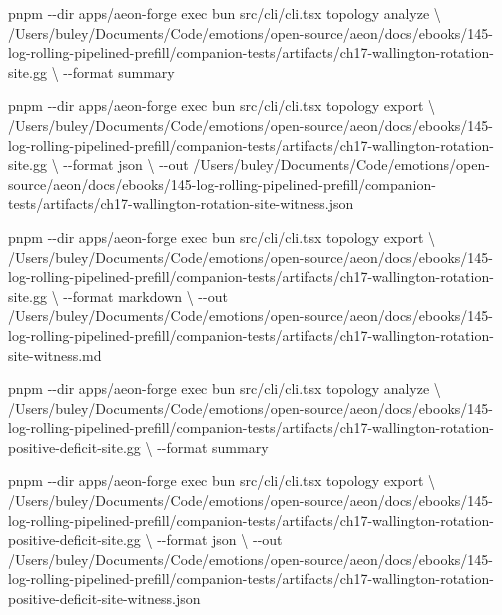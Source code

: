 \documentclass[
  11pt,
]{article}
\newenvironment{Shaded}{}{}
\newcommand{\AttributeTok}[1]{\textcolor[rgb]{0.49,0.56,0.16}{#1}}
\newcommand{\DataTypeTok}[1]{\textcolor[rgb]{0.56,0.13,0.00}{#1}}
\newcommand{\ExtensionTok}[1]{#1}
\newcommand{\NormalTok}[1]{#1}
\begin{document}
\begin{Shaded}
\begin{Highlighting}[]
\ExtensionTok{pnpm} \AttributeTok{{-}{-}dir}\NormalTok{ apps/aeon{-}forge exec bun src/cli/cli.tsx topology analyze }\DataTypeTok{\textbackslash{}}
\NormalTok{  /Users/buley/Documents/Code/emotions/open{-}source/aeon/docs/ebooks/145{-}log{-}rolling{-}pipelined{-}prefill/companion{-}tests/artifacts/ch17{-}wallington{-}rotation{-}site.gg }\DataTypeTok{\textbackslash{}}
  \AttributeTok{{-}{-}format}\NormalTok{ summary}

\ExtensionTok{pnpm} \AttributeTok{{-}{-}dir}\NormalTok{ apps/aeon{-}forge exec bun src/cli/cli.tsx topology export }\DataTypeTok{\textbackslash{}}
\NormalTok{  /Users/buley/Documents/Code/emotions/open{-}source/aeon/docs/ebooks/145{-}log{-}rolling{-}pipelined{-}prefill/companion{-}tests/artifacts/ch17{-}wallington{-}rotation{-}site.gg }\DataTypeTok{\textbackslash{}}
  \AttributeTok{{-}{-}format}\NormalTok{ json }\DataTypeTok{\textbackslash{}}
  \AttributeTok{{-}{-}out}\NormalTok{ /Users/buley/Documents/Code/emotions/open{-}source/aeon/docs/ebooks/145{-}log{-}rolling{-}pipelined{-}prefill/companion{-}tests/artifacts/ch17{-}wallington{-}rotation{-}site{-}witness.json}

\ExtensionTok{pnpm} \AttributeTok{{-}{-}dir}\NormalTok{ apps/aeon{-}forge exec bun src/cli/cli.tsx topology export }\DataTypeTok{\textbackslash{}}
\NormalTok{  /Users/buley/Documents/Code/emotions/open{-}source/aeon/docs/ebooks/145{-}log{-}rolling{-}pipelined{-}prefill/companion{-}tests/artifacts/ch17{-}wallington{-}rotation{-}site.gg }\DataTypeTok{\textbackslash{}}
  \AttributeTok{{-}{-}format}\NormalTok{ markdown }\DataTypeTok{\textbackslash{}}
  \AttributeTok{{-}{-}out}\NormalTok{ /Users/buley/Documents/Code/emotions/open{-}source/aeon/docs/ebooks/145{-}log{-}rolling{-}pipelined{-}prefill/companion{-}tests/artifacts/ch17{-}wallington{-}rotation{-}site{-}witness.md}

\ExtensionTok{pnpm} \AttributeTok{{-}{-}dir}\NormalTok{ apps/aeon{-}forge exec bun src/cli/cli.tsx topology analyze }\DataTypeTok{\textbackslash{}}
\NormalTok{  /Users/buley/Documents/Code/emotions/open{-}source/aeon/docs/ebooks/145{-}log{-}rolling{-}pipelined{-}prefill/companion{-}tests/artifacts/ch17{-}wallington{-}rotation{-}positive{-}deficit{-}site.gg }\DataTypeTok{\textbackslash{}}
  \AttributeTok{{-}{-}format}\NormalTok{ summary}

\ExtensionTok{pnpm} \AttributeTok{{-}{-}dir}\NormalTok{ apps/aeon{-}forge exec bun src/cli/cli.tsx topology export }\DataTypeTok{\textbackslash{}}
\NormalTok{  /Users/buley/Documents/Code/emotions/open{-}source/aeon/docs/ebooks/145{-}log{-}rolling{-}pipelined{-}prefill/companion{-}tests/artifacts/ch17{-}wallington{-}rotation{-}positive{-}deficit{-}site.gg }\DataTypeTok{\textbackslash{}}
  \AttributeTok{{-}{-}format}\NormalTok{ json }\DataTypeTok{\textbackslash{}}
  \AttributeTok{{-}{-}out}\NormalTok{ /Users/buley/Documents/Code/emotions/open{-}source/aeon/docs/ebooks/145{-}log{-}rolling{-}pipelined{-}prefill/companion{-}tests/artifacts/ch17{-}wallington{-}rotation{-}positive{-}deficit{-}site{-}witness.json}


\end{Highlighting}
\end{Shaded}
\end{document}

